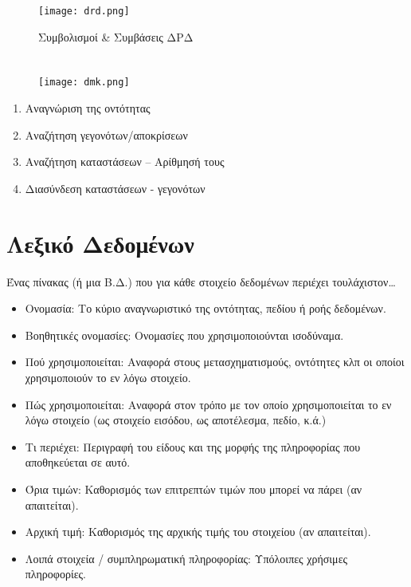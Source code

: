 \begin{figure}[H]
	\centering
	\texttt{[image: drd.png]}
	\caption{Συμβολισμοί \& Συμβάσεις ΔΡΔ}
\end{figure}


\section{}

\begin{figure}[H]
	\centering
	\texttt{[image: dmk.png]}
	\caption{}
\end{figure}

\begin{enumerate}
	\item	Αναγνώριση της οντότητας
	\item	Αναζήτηση γεγονότων/αποκρίσεων
	\item	Αναζήτηση καταστάσεων – Αρίθμησή τους
	\item	Διασύνδεση καταστάσεων - γεγονότων
\end{enumerate}

\section{Λεξικό Δεδομένων}

Ένας πίνακας (ή μια Β.Δ.) που για κάθε στοιχείο δεδομένων περιέχει τουλάχιστον…

\begin{itemize}
	\item	Ονομασία: Το κύριο αναγνωριστικό της οντότητας, πεδίου ή ροής δεδομένων.
	\item	Βοηθητικές ονομασίες: Ονομασίες που χρησιμοποιούνται ισοδύναμα.
	\item	Πού χρησιμοποιείται: Αναφορά στους μετασχηματισμούς, οντότητες κλπ 
		οι οποίοι χρησιμοποιούν το εν λόγω στοιχείο.
	\item	Πώς χρησιμοποιείται: Αναφορά στον τρόπο με τον οποίο χρησιμοποιείται το εν λόγω στοιχείο
		(ως στοιχείο εισόδου, ως αποτέλεσμα, πεδίο, κ.ά.)
	\item	Τι περιέχει: Περιγραφή του είδους και της μορφής της πληροφορίας που αποθηκεύεται σε αυτό.
	\item	Όρια τιμών: Καθορισμός των επιτρεπτών τιμών που μπορεί να πάρει (αν απαιτείται).
	\item	Αρχική τιμή: Καθορισμός της αρχικής τιμής του στοιχείου (αν απαιτείται).
	\item	Λοιπά στοιχεία / συμπληρωματική πληροφορίας: Υπόλοιπες χρήσιμες πληροφορίες.
\end{itemize}
